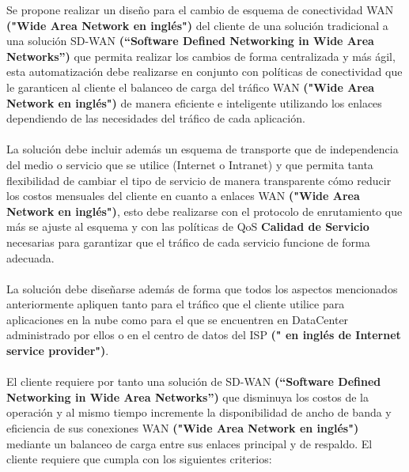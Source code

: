 Se propone realizar un diseño para el cambio de esquema de conectividad WAN \textbf{("Wide Area Network en inglés")} del cliente de una solución tradicional a una solución SD-WAN \textbf{(“Software Defined Networking in Wide Area Networks”)} que permita realizar los cambios de forma centralizada y más ágil, esta automatización debe realizarse en conjunto con políticas de conectividad que le garanticen al cliente el balanceo de carga del tráfico WAN \textbf{("Wide Area Network en inglés")} de manera eficiente e inteligente utilizando los enlaces dependiendo de las necesidades del tráfico de cada aplicación.
\\
\\
	La solución debe incluir además un esquema de transporte que de independencia del medio o servicio que se utilice (Internet o Intranet) y que permita tanta flexibilidad de cambiar el tipo de servicio de manera transparente cómo reducir los costos mensuales del cliente en cuanto a enlaces WAN \textbf{("Wide Area Network en inglés")}, esto debe realizarse con el protocolo de enrutamiento que más se ajuste al esquema y con las políticas de QoS \textbf{Calidad de Servicio} necesarias para garantizar que el tráfico de cada servicio funcione de forma adecuada.
\\
\\
	La solución debe diseñarse además de forma que todos los aspectos mencionados anteriormente apliquen tanto para el tráfico que el cliente utilice para aplicaciones en la nube como para el que se encuentren en DataCenter administrado por ellos o en el centro de datos del ISP \textbf{(" en inglés de Internet service provider")}.
\\
\\
	El cliente requiere por tanto una solución de SD-WAN \textbf{(“Software Defined Networking in Wide Area Networks”)} que disminuya los costos de la operación y al mismo tiempo incremente la disponibilidad de ancho de banda y eficiencia de sus conexiones WAN \textbf{("Wide Area Network en inglés")} mediante un balanceo de carga entre sus enlaces principal y de respaldo. El cliente requiere que cumpla con los siguientes criterios:

